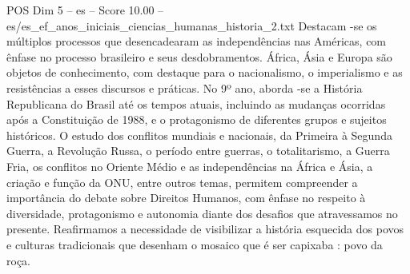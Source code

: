 \begin{textsample}{POS Dim 5 – es – Score 10.00 – es/es\_ef\_anos\_iniciais\_ciencias\_humanas\_historia\_2.txt}  \label{ex:f5_pos_103}
Destacam -se os múltiplos processos que desencadearam as independências nas Américas, com ênfase no processo brasileiro e seus desdobramentos.
África, Ásia e Europa são objetos de conhecimento, com destaque para o nacionalismo, o imperialismo e as resistências a esses discursos e práticas.
No 9º ano, aborda -se a História Republicana do Brasil até os tempos atuais, incluindo as mudanças ocorridas após a Constituição de 1988, e o protagonismo de diferentes grupos e sujeitos históricos.
O estudo dos conflitos mundiais e nacionais, da Primeira à Segunda Guerra, a Revolução Russa, o período entre guerras, o totalitarismo, a Guerra Fria, os conflitos no Oriente Médio e as independências na África e Ásia, a criação e função da ONU, entre outros temas, permitem compreender a importância do debate sobre Direitos Humanos, com ênfase no respeito à diversidade, protagonismo e autonomia diante dos desafios que atravessamos no presente.
Reafirmamos a necessidade de visibilizar a história esquecida dos povos e culturas tradicionais que desenham o mosaico que é ser capixaba : povo da roça.

\end{textsample}
